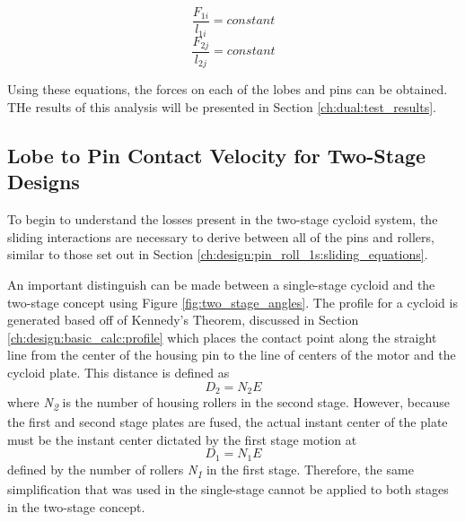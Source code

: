 \begin{equation} 
\frac{F_{1i}}{l_{1i}} = constant 
\end{equation}
\begin{equation}
\frac{F_{2j}}{l_{2j}} = constant
\end{equation}

Using these equations, the forces on each of the lobes and pins can be obtained. THe results of this analysis will be presented in Section \ref{ch:dual:test_results}.

\subsection{Lobe to Pin Contact Velocity for Two-Stage Designs}\label{ch:dual:equations:vel}
To begin to understand the losses present in the two-stage cycloid system, the sliding interactions are necessary to derive between all of the pins and rollers, similar to those set out in Section \ref{ch:design:pin_roll_1s:sliding_equations}.

An important distinguish can be made between a single-stage cycloid and the two-stage concept using Figure \ref{fig:two_stage_angles}. The profile for a cycloid is generated based off of Kennedy's Theorem, discussed in Section \ref{ch:design:basic_calc:profile} which places the contact point along the straight line from the center of the housing pin to the line of centers of the motor and the cycloid plate. This distance is defined as 
\begin{equation}
D_2 = N_2 E
\end{equation} 
where \textit{N\textsubscript{2}} is the number of housing rollers in the second stage. However, because the first and second stage plates are fused, the actual instant center of the plate must be the instant center dictated by the first stage motion at 
\begin{equation}
D_1 = N_1 E 
\end{equation} 
defined by the number of rollers \textit{N\textsubscript{1}} in the first stage. Therefore, the same simplification that was used in the single-stage cannot be applied to both stages in the two-stage concept. 

